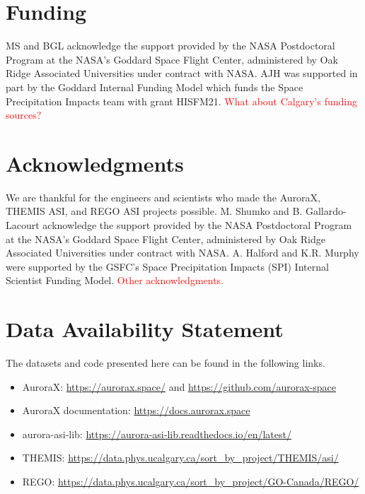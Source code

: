 \documentclass[utf8]{FrontiersinHarvard} %
\begin{document}
\section*{Funding}
MS and BGL acknowledge the support provided by the NASA Postdoctoral Program at the NASA's Goddard Space Flight Center, administered by Oak Ridge Associated Universities under contract with NASA. AJH was supported in part by the Goddard Internal Funding Model which funds the Space Precipitation Impacts team with grant HISFM21. \textcolor{red}{What about Calgary's funding sources?}

\section*{Acknowledgments}
We are thankful for the engineers and scientists who made the AuroraX, THEMIS ASI, and REGO ASI projects possible. M. Shumko and B. Gallardo-Lacourt acknowledge the support provided by the NASA Postdoctoral Program at the NASA’s Goddard Space Flight Center, administered by Oak Ridge Associated Universities under contract with NASA. A. Halford and K.R. Murphy were supported by the GSFC's Space Precipitation Impacts (SPI) Internal Scientist Funding Model. \textcolor{red}{Other acknowledgments.}

\section*{Data Availability Statement}
The datasets and code presented here can be found in the following links.
\begin{itemize}
    \item AuroraX: \url{https://aurorax.space/} and \url{https://github.com/aurorax-space}
    \item AuroraX documentation: \url{https://docs.aurorax.space}
    \item aurora-asi-lib: \url{https://aurora-asi-lib.readthedocs.io/en/latest/}
    \item THEMIS: \url{https://data.phys.ucalgary.ca/sort_by_project/THEMIS/asi/}
    \item REGO: \url{https://data.phys.ucalgary.ca/sort_by_project/GO-Canada/REGO/}
\end{itemize}
\end{document}
